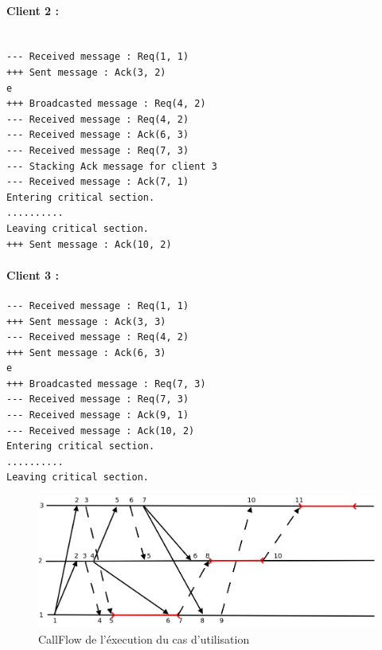 \paragraph{Client 2 :\\}

        \begin{minipage}{0.90\textwidth}
                \begin{lstlisting}

--- Received message : Req(1, 1)
+++ Sent message : Ack(3, 2)
e
+++ Broadcasted message : Req(4, 2)
--- Received message : Req(4, 2)
--- Received message : Ack(6, 3)
--- Received message : Req(7, 3)
--- Stacking Ack message for client 3
--- Received message : Ack(7, 1)
Entering critical section.
..........
Leaving critical section.
+++ Sent message : Ack(10, 2)
\end{lstlisting}
        \end{minipage}

\paragraph{Client 3 :\\ }

        \begin{minipage}{0.90\textwidth}
                \begin{lstlisting}
--- Received message : Req(1, 1)
+++ Sent message : Ack(3, 3)
--- Received message : Req(4, 2)
+++ Sent message : Ack(6, 3)
e
+++ Broadcasted message : Req(7, 3)
--- Received message : Req(7, 3)
--- Received message : Ack(9, 1)
--- Received message : Ack(10, 2)
Entering critical section.
..........
Leaving critical section.

\end{lstlisting}
        \end{minipage}
\begin{center}
\begin{figure}[H]
	\includegraphics[width=\textwidth]{images/casUtil.png}
\caption{CallFlow de l'éxecution du cas d'utilisation}
\end{figure}
\end{center}